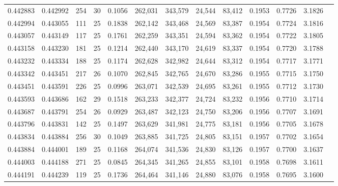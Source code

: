 \begin{tabular}{rrrrrrrrrrrrr}
0.442883 & 0.442992 & 254 &  30 &                                     0.1056 & 262,031 & 343,579 &  24,544 &  83,412 & 0.1953 & 0.7726 & 3.1826 \\
0.442994 & 0.443055 & 111 &  25 &                                     0.1838 & 262,142 & 343,468 &  24,569 &  83,387 & 0.1954 & 0.7724 & 3.1816 \\
0.443057 & 0.443149 & 117 &  25 &                                     0.1761 & 262,259 & 343,351 &  24,594 &  83,362 & 0.1954 & 0.7722 & 3.1805 \\
0.443158 & 0.443230 & 181 &  25 &                                     0.1214 & 262,440 & 343,170 &  24,619 &  83,337 & 0.1954 & 0.7720 & 3.1788 \\
0.443232 & 0.443334 & 188 &  25 &                                     0.1174 & 262,628 & 342,982 &  24,644 &  83,312 & 0.1954 & 0.7717 & 3.1771 \\
0.443342 & 0.443451 & 217 &  26 &                                     0.1070 & 262,845 & 342,765 &  24,670 &  83,286 & 0.1955 & 0.7715 & 3.1750 \\
0.443451 & 0.443591 & 226 &  25 &                                     0.0996 & 263,071 & 342,539 &  24,695 &  83,261 & 0.1955 & 0.7712 & 3.1730 \\
0.443593 & 0.443686 & 162 &  29 &                                     0.1518 & 263,233 & 342,377 &  24,724 &  83,232 & 0.1956 & 0.7710 & 3.1714 \\
0.443687 & 0.443791 & 254 &  26 &                                     0.0929 & 263,487 & 342,123 &  24,750 &  83,206 & 0.1956 & 0.7707 & 3.1691 \\
0.443796 & 0.443831 & 142 &  25 &                                     0.1497 & 263,629 & 341,981 &  24,775 &  83,181 & 0.1956 & 0.7705 & 3.1678 \\
0.443834 & 0.443884 & 256 &  30 &                                     0.1049 & 263,885 & 341,725 &  24,805 &  83,151 & 0.1957 & 0.7702 & 3.1654 \\
0.443884 & 0.444001 & 189 &  25 &                                     0.1168 & 264,074 & 341,536 &  24,830 &  83,126 & 0.1957 & 0.7700 & 3.1637 \\
0.444003 & 0.444188 & 271 &  25 &                                     0.0845 & 264,345 & 341,265 &  24,855 &  83,101 & 0.1958 & 0.7698 & 3.1611 \\
0.444191 & 0.444239 & 119 &  25 &                                     0.1736 & 264,464 & 341,146 &  24,880 &  83,076 & 0.1958 & 0.7695 & 3.1600 \\

\end{tabular}
